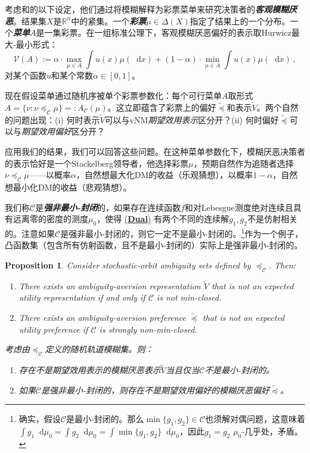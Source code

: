 \documentclass[12pt,letterpaper]{article}
\newenvironment{original}{\color{black}}{}
\newenvironment{translation}{\color{blue}}{}
\theoremstyle{plain}
\newtheorem{prop}{Proposition}
\theoremstyle{definition}
\theoremstyle{remark}
\newcommand{\C}{\mathcal{C}}
\newcommand{\R}{\mathds{R}}
\renewcommand*\d{\mathop{}\!\mathrm{d}}
\theoremstyle{definition}
\DeclareRobustCommand{\weqref}[2]{
  \leavevmode\nobreak\hbox{\hyperlink{#2}{\textup{(#1)}}}
}
\begin{document}
\begin{translation}
考虑\citet{olszewski2007preferences}和\citet{Ahn2008AmbiguityWithoutStateSpace}的以下设定，他们通过将模糊解释为彩票菜单来研究决策者的\textit{\textbf{客观模糊厌恶}}。结果集$X$是$\R^n$中的紧集。一个\textit{\textbf{彩票}}$\mu \in \Delta(X)$指定了结果上的一个分布。一个\textit{\textbf{菜单}}$A$是一集彩票。在一组标准公理下，客观模糊厌恶偏好的表示取Hurwicz最大-最小形式：
\[
\mathcal{V}(A) := \alpha \cdot \max_{\mu \in A} \int u(x) \mu(\d x) + (1 - \alpha) \cdot \min_{\mu \in A} \int u(x) \mu(\d x)\,,
\]
对某个函数$u$和某个常数$\alpha \in [0, 1]$。

现在假设菜单通过随机序被单个彩票参数化：每个可行菜单$A$取形式$A=\{\nu: \nu \preceq_\C \mu\}=:A_\C(\mu)$。这立即蕴含了彩票上的偏好$\widetilde{\preceq}$和表示$\widetilde{V}$。两个自然的问题出现：(i) 何时表示$\widetilde{V}$可以与vNM\textit{期望效用表示}区分开？(ii) 何时偏好$\widetilde{\preceq}$可以与\textit{期望效用偏好}区分开？

应用我们的结果，我们可以回答这些问题。在这种菜单参数化下，模糊厌恶决策者的表示恰好是一个Stackelberg领导者，他选择彩票$\mu$，预期自然作为追随者选择$\nu \preceq_\C \mu$——以概率$\alpha$，自然想最大化DM的收益（乐观猜想），以概率$1-\alpha$，自然想最小化DM的收益（悲观猜想）。

我们称$\C$是\textit{\textbf{强非最小-封闭}}的，如果存在连续函数$f$和对Lebesgue测度绝对连续且具有远离零的密度的测度$\mu_0$，使得\weqref{\textbf{Dual}}{eq:dual}有两个不同的连续解$g_1, g_2$不是仿射相关的。注意如果$\C$是强非最小-封闭的，则它一定不是最小-封闭的。\footnote{确实，假设$\C$是最小-封闭的。那么$\min\{g_1,g_2\} \in \C$也须解对偶问题，这意味着$\int g_1 \d \mu_0=\int g_2 \d \mu_0=\int \min\{g_1,g_2\} \d \mu_0$，因此$g_1=g_2$ $\mu_0$-几乎处，矛盾。}作为一个例子，凸函数集（包含所有仿射函数，且不是最小-封闭的）实际上是强非最小-封闭的。
\end{translation}

\begin{prop}\label{prop:ambiguity}
\begin{original}
Consider stochastic-orbit ambiguity sets defined by $\preceq_\C$. Then:
\begin{enumerate}
\item [(i)] There exists an ambiguity-aversion representation $\widetilde{V}$ that is not an expected utility representation if and only if $\C$ is not min-closed.
\item [(ii)] There exists an ambiguity-aversion preference $\widetilde{\preceq}$ that is not an expected utility preference if $\C$ is strongly non-min-closed.
\end{enumerate}
\end{original}
\begin{translation}
考虑由$\preceq_\C$定义的随机轨道模糊集。则：
\begin{enumerate}
\item [(i)] 存在不是期望效用表示的模糊厌恶表示$\widetilde{V}$当且仅当$\C$不是最小-封闭的。
\item [(ii)] 如果$\C$是强非最小-封闭的，则存在不是期望效用偏好的模糊厌恶偏好$\widetilde{\preceq}$。
\end{enumerate}
\end{translation}
\end{prop}
\end{document}
